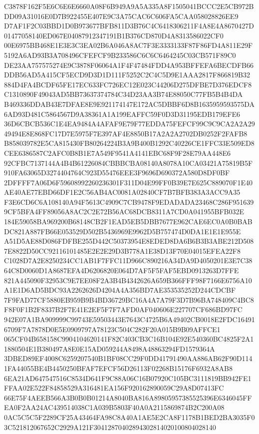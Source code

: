 \documentclass[UTF8,fontset=fandol,zihao=-4,a4paper]{ctexart}
\begin{document}
{{C3878F162F5E6C6E6E6660A08F6B949A9A5A335A8F1505041BCCC2E5CB972BDD09A31016E0D7B922455E407E9C3A75CAC6C606FA5CAA058028826EE9
D7AF1F2C03BBD1D0B973677BFB811D3B76C4C6418306211F4A8E4A8670427D01477058140ED067E04087912347191B1B376CD870D4A8313586022CF0
00E6975BB468E1E3E3C3EA02B6A046A8AC7F3E3333133F87F86FD4A811E29F5192A6AD93B3A708496CFEFCF9B233586C6C6C6464245C03CB571F89C0
DE23AA757575274E9C3878F06064A1F4F47484FDD4A953BFFEFA6BECDFB66DDB56AD5A415CF5ECD9D3D1D111F5252C2C4C5D9E1AAA2817F866819B32
884D4FA4BCDF65FE17EC633FC726EC12E023C44206D275DFBE7D376EDCF8C1310890F49043AD5BB73637374784C34D23AA3B74E88050C77FB5B4B4DA
B469336DDAB43E7DFAE8E9E921174147E172AC5DBBF6D8B1635959593575DA6AD93D481C5864567D9A38361A1A199EAFFC59F0D3D31195EDB179EFE6
36D6CBCB536C1E4EA9484A4AFAF9E79F77EDDA75FEFCF99C9C9CA2A2A2949494E8E868FC17D7E5975F7E397AF4E8850B17A2A2A2702DB0252F2FAFB8
B858039782E5CA815430FB80264224B3A9B400B1292C40226CE1FFC33E509ED8CEE6386587C2AFC0B8B1E7A549F9541A4141EBC68F9F28E79AA448E6
92CFBC7137144A4B4B61226084CBBBCBA08140A8078A10CA03421A75819B5F910FA63065D3274404764C923D55476EEE3F9696D690372A580D8DF0BF
2DFFFF7A06D6F59608992260236301F311D04E99FF0B39E7E625C889070F1E40AE40AE77EBD66DF1E2C56AB4AC0081A02840CF7B7BFB383A3ACC9A35
F3E6CD6C6A108140A94F5613C4909C7CB9478F9EDADADA23468C286F9516399CF5BFA4FF89056A8AC2C2E72B56AC68DCB8311A7CD0A041955BFB032E
184E59058BA969200B68148CB2F1EAD5EB5DBB7677E962CAE6EC0A0B0BABDC821A887FB66E053529D502B5436969E9962D5B757474D0DA1E1E1E955E
A51D5AE88D086FDFBE255D442C50373954E8EDED8DA6B6B3B3ABE212D5087E8822D50CC92116101485E2E2E29D3B778A1E38D13F70E04015EFEA22F8
C1028D7A2E8250234CC1AB1F7FFC11D966C890216A34DA9D4050201E3E7C3864C8D0060D1A8687EFA4D6206820E064D7AF5F5FAF5EBD0913263D7FFE
821A445090F32953C9E7EE08F2A3B4B4342626A659B366FFF98F7166E6756A10A1E1D6AD5BDC93A2262626D4204A4A356BD7AE353535252D244CDCBF
7F9FAD77CF5880EB959B9B4BD36729BC16A4A7A79F3D7B96BA748409C4BC8F8F0F1B2F8337B2F7E41E2EF5F7F7AFD0AF040606E227707CF686BD97FC
942E07A1BA909999C99743E59503443E7643C4725B6A49402CB0018E2FDC164916709F7A7878D0E5E0909797A78123C504C282F20A015B9B09AFFCE1
065CF04B658158C9904104620141F82C403CB3C16B104E92E540360BC4825F2A11880504E1B380497A8E0E15AD059244A8498A48863294FD1579364A
3DBED89EF4008C6259207540B1BF08CC29F0DD41791490AA886AB62F90D1141FA44055BE4B4450250BFAF7EFCF56D26113F02268B15176F6932A8AB8
6EA21AD647547516C8534D641F9C88A06C16B07920C105BC3111819BB942FE1FFAA02E522F84858529A316481EA156F920162890059C29A8D07413FC
66E75F4AEEB566A3B0B0B01214A8040BA816A89805957385525396E6346045FFEA0F2AA24AC439514038C1A039B5803F40A0A2115869874B2C200A08
0AC5C5C5F2289CF25A43464FA98C8A40A1AE5E2CA8F1178B1BED2BA3035F03C521812067652C2929A121F30412870402894302814020100804028140
}}
\end{document}
